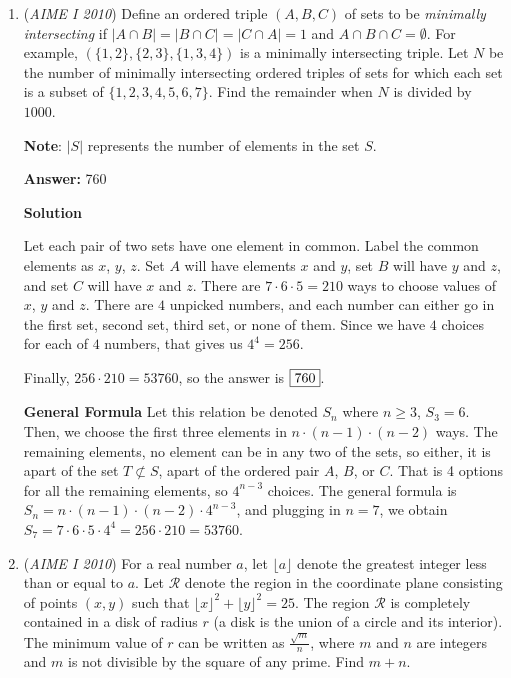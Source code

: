 \begin{enumerate}
 


	\item (\textit{AIME I 2010}) Define an ordered triple $(A, B, C)$ of sets to be \textit{minimally intersecting} if $|A \cap B| = |B \cap C| = |C \cap A| = 1$ and $A \cap B \cap C = \emptyset$. For example, $(\{1,2\},\{2,3\},\{1,3,4\})$ is a minimally intersecting triple. Let $N$ be the number of minimally intersecting ordered triples of sets for which each set is a subset of $\{1,2,3,4,5,6,7\}$. Find the remainder when $N$ is divided by $1000$.


 \textbf{Note}: $|S|$ represents the number of elements in the set $S$.


 
 \textbf{Answer: }760



\textbf{Solution}

Let each pair of two sets have one element in common. Label the common elements as $x$, $y$, $z$. Set $A$ will have elements $x$ and $y$, set $B$ will have $y$ and $z$, and set $C$ will have $x$ and $z$. There are $7 \cdot 6 \cdot 5 = 210$ ways to choose values of $x$, $y$ and $z$. There are $4$ unpicked numbers, and each number can either go in the first set, second set, third set, or none of them. Since we have $4$ choices for each of $4$ numbers, that gives us $4^4 = 256$.

 Finally, $256 \cdot 210 = 53760$, so the answer is $\fbox{760}$.

 \textbf{General Formula} Let this relation be denoted $S_n$ where $n \ge 3$, $S_3 = 6$. Then, we choose the first three elements in $n \cdot (n-1) \cdot (n-2)$ ways. The remaining elements, no element can be in any two of the sets, so either, it is apart of the set $T \not \subset S$, apart of the ordered pair $A$, $B$, or $C$. That is 4 options for all the remaining elements, so $4^{n-3}$ choices. The general formula is $S_n = n \cdot (n-1) \cdot (n-2) \cdot 4^{n-3}$, and plugging in $n=7$, we obtain $S_7 = 7 \cdot 6 \cdot 5 \cdot 4^4 = 256 \cdot 210 = 53\boxed{760}$.

 


	\item (\textit{AIME I 2010}) For a real number $a$, let $\lfloor a \rfloor$ denote the greatest integer less than or equal to $a$. Let $\mathcal{R}$ denote the region in the coordinate plane consisting of points $(x,y)$ such that $\lfloor x \rfloor ^2 + \lfloor y \rfloor ^2 = 25$. The region $\mathcal{R}$ is completely contained in a disk of radius $r$ (a disk is the union of a circle and its interior). The minimum value of $r$ can be written as $\frac {\sqrt {m}}{n}$, where $m$ and $n$ are integers and $m$ is not divisible by the square of any prime. Find $m + n$.



\end{enumerate}
